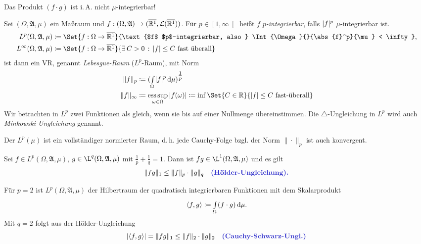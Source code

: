 \documentclass{cheat-sheet}
\newcommand{\Alg}{\mathfrak{A}} %
\renewcommand{\ER}{\overline{\R^1}} %
\DeclareMathOperator*{\esssup}{ess\,sup} %
\newcommand{\IntOmu}[1]{\Int{\Omega}{}{#1}{\mu}} %
\begin{document}
\begin{acht}
  Das Produkt $(f \cdot g)$ ist i.\,A. nicht $\mu$-integrierbar!
\end{acht}

\begin{defn}
  Sei $(\Omega, \Alg, \mu)$ ein Maßraum und $f : (\Omega, \Alg) \to (\ER, \mathcal{L}(\ER))$. Für $p \in \left[1, \infty\right[$ heißt $f$ \emph{$p$-integrierbar}, falls $\lvert f\rvert^p$ $\mu$-integrierbar ist.
  \begin{align*}
    L^p(\Omega, \Alg, \mu) &\coloneqq \Set{ f : \Omega \to \ER }{\text{$f$ $p$-integrierbar, also } \IntOmu{\abs{f}^p} < \infty}, \\
    L^\infty(\Omega, \Alg, \mu) &\coloneqq \Set{ f : \Omega \to \ER }{\exists \, C > 0 \,:\, \abs{f} \leq C \text{ fast überall}}
  \end{align*}
  ist dann ein VR, genannt \emph{Lebesgue-Raum} ($L^p$-Raum), mit Norm
  \begin{align*}
    \norm{f}_p &\coloneqq ( \IntOmu{\abs{f}^p} )^{\tfrac{1}{p}} \\
    \norm{f}_\infty &\coloneqq \esssup_{\omega \in \Omega} \, \abs{f(\omega)} \coloneqq \inf \Set{ C \in \R }{ \abs{f} \leq C \text{ fast-überall} }
  \end{align*}
  Wir betrachten in $L^p$ zwei Funktionen als gleich, wenn sie bis auf einer Nullmenge übereinstimmen. Die $\triangle$-Ungleichung in $L^p$ wird auch \emph{Minkowski-Ungleichung} genannt.
\end{defn}

\begin{satz}
  Der $L^p(\mu)$ ist ein vollständiger normierter Raum, d.\,h. jede Cauchy-Folge bzgl. der Norm $\| \cdot \|_p$ ist auch konvergent.
\end{satz}

\begin{satz}
  Sei $f \in L^p(\Omega, \Alg, \mu)$, $g \in \L^q(\Omega, \Alg, \mu)$ mit $\tfrac{1}{p} + \tfrac{1}{q} = 1$. Dann ist $fg \in \L^1(\Omega, \Alg, \mu)$ und es gilt
  \[ \norm{fg}_1 \leq \norm{f}_p \cdot \norm{g}_q \quad \text{\emph{(Hölder-Ungleichung).}} \]
\end{satz}

\begin{bem}
  Für $p = 2$ ist $L^p(\Omega, \Alg, \mu)$ der Hilbertraum der quadratisch integrierbaren Funktionen mit dem Skalarprodukt
  \[ \langle f , g \rangle \coloneqq \IntOmu{(f \cdot g)}. \]
  Mit $q = 2$ folgt aus der Hölder-Ungleichung
  \[ \abs{\langle f , g \rangle} = \norm{fg}_1 \leq \norm{f}_2 \cdot \norm{g}_2 \quad \text{\emph{(Cauchy-Schwarz-Ungl.)}} \]
\end{bem}
\end{document}
